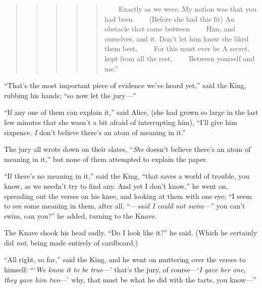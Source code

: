 \documentclass[11pt,openany,oneside]{book}
\begin{document}
\begin{quote}
\begin{quote}
\begin{quote}
\begin{quote}
\begin{quote}
{\small  ~~~~Exactly as we were.}\newline
{\small  }\newline
{\small  My notion was that you had been}\newline
{\small  ~~~~(Before she had this fit)}\newline
{\small  An obstacle that came between}\newline
{\small  ~~~~Him, and ourselves, and it.}\newline
{\small  }\newline
{\small  Don’t let him know she liked them best,}\newline
{\small  ~~~~For this must ever be}\newline
{\small  A secret, kept from all the rest,}\newline
{\small  ~~~~Between yourself and me.” }

\end{quote}
\end{quote}
\end{quote}
\end{quote}
\end{quote}
“That’s the most important piece of evidence we’ve heard yet,” said the King, rubbing his hands; “so now let the jury—” 

“If any one of them can explain it,” said Alice, (she had grown so large in the last few minutes that she wasn’t a bit afraid of interrupting him), “I’ll give him sixpence. {\em I\/} don’t believe there’s an atom of meaning in it.” 

The jury all wrote down on their slates, “{\em She\/} doesn’t believe there’s an atom of meaning in it,” but none of them attempted to explain the paper. 

“If there’s no meaning in it,” said the King, “that saves a world of trouble, you know, as we needn’t try to find any. And yet I don’t know,” he went on, spreading out the verses on his knee, and looking at them with one eye; “I seem to see some meaning in them, after all. “—{\em said I could not swim\/}—” you can’t swim, can you?” he added, turning to the Knave. 

The Knave shook his head sadly. “Do I look like it?” he said. (Which he certainly did {\em not\/}, being made entirely of cardboard.) 

“All right, so far,” said the King, and he went on muttering over the verses to himself: “‘{\em We know it to be true\/}—’ that’s the jury, of course—‘{\em I gave her one, they gave him two\/}—’ why, that must be what he did with the tarts, you know—” 
\end{document}
